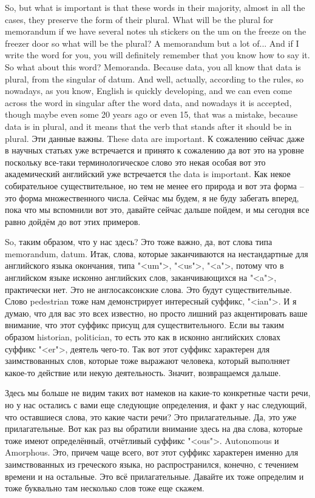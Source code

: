 \documentclass[main.tex]{subfiles}
\begin{document}
So, but what is important is that these words in their majority, almost in all the cases, they preserve the form of their plural.
What will be the plural for memorandum if we have several notes uh stickers on the um on the freeze on the freezer door so what will be the plural?
A memorandum but a lot of...
And if I write the word for you, you will definitely remember that you know how to say it.
So what about this word? Memoranda.
Because data, you all know that data is plural, from the singular of datum.
And well, actually, according to the rules, so nowadays, as you know, English is quickly developing, and we can even come across the word in singular after the word data, and nowadays it is accepted, though maybe even some 20 years ago or even 15, that was a mistake, because data is in plural, and it means that the verb that stands after it should be in plural.
Эти данные важны.
These data are important.
К сожалению сейчас даже в научных статьях уже встречается и принято к сожалению да вот это на уровне поскольку все-таки терминологическое слово это некая особая вот это академический английский уже встречается the data is important.
Как некое собирательное существительное, но тем не менее его природа и вот эта форма -- это форма множественного числа.
Сейчас мы будем, я не буду забегать вперед, пока что мы вспомнили вот это, давайте сейчас дальше пойдем, и мы сегодня все равно дойдём до вот этих примеров.

So, таким образом, что у нас здесь?
Это тоже важно, да, вот слова типа memorandum, datum.
Итак, слова, которые заканчиваются на нестандартные для английского языка окончания, типа "<um">, "<us">, "<a">, потому что в английском языке исконно английских слов, заканчивающихся на "<a">, практически нет.
Это не англосаксонские слова.
Это будут существительные.
Слово pedestrian тоже нам демонстрирует интересный суффикс, "<ian">.
И я думаю, что для вас это всех известно, но просто лишний раз акцентировать ваше внимание, что этот суффикс присущ для существительного.
Если вы таким образом historian, politician, то есть это как в исконно английских словах суффикс "<er">, деятель чего-то.
Так вот этот суффикс характерен для заимствованных слов, которые тоже выражают человека, который выполняет какое-то действие или некую деятельность.
Значит, возвращаемся дальше.

Здесь мы больше не видим таких вот намеков на какие-то конкретные части речи, но у нас остались с вами еще следующие определения, и факт у нас следующий, что оставшиеся слова, это какие части речи?
Это прилагательные.
Да, это уже прилагательные.
Вот как раз вы обратили внимание здесь на два слова, которые тоже имеют определённый, отчётливый суффикс "<ous">.
Autonomous и Amorphous.
Это, причем чаще всего, вот этот суффикс характерен именно для заимствованных из греческого языка, но распространился, конечно, с течением времени и на остальные.
Это всё прилагательные.
Давайте их тоже определим и тоже буквально там несколько слов тоже еще скажем.
\end{document}
